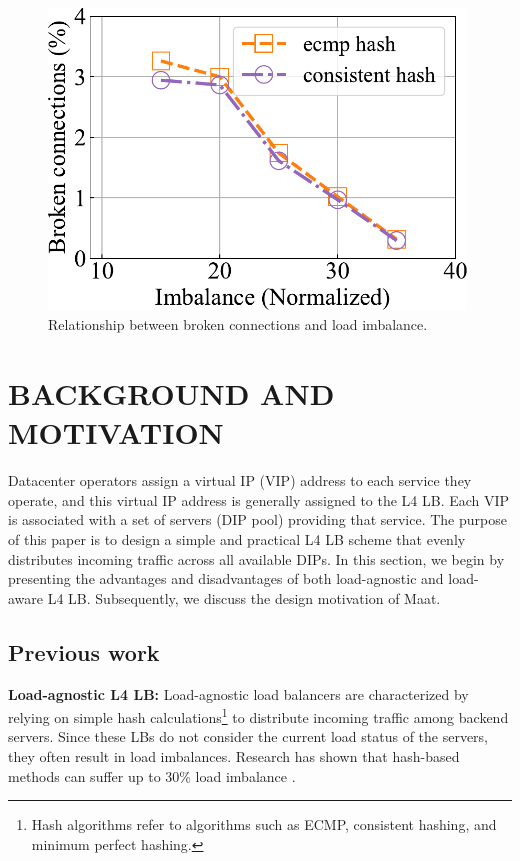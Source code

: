 \begin{figure}[htbp]
\begin{minipage}[t]{0.33\linewidth}
		\includegraphics[width=0.988\textwidth]{experiment/2brokenimbalance.pdf}
		\caption{Relationship between broken connections and load imbalance.}
		\label{3}
	\end{minipage}
\end{figure}

\section{BACKGROUND AND MOTIVATION}
Datacenter operators assign a virtual IP (VIP) address to each service they operate, and this virtual IP address is generally assigned to the L4 LB. Each VIP is associated with a set of servers (DIP pool) providing that service. The purpose of this paper is to design a simple and practical L4 LB scheme that evenly distributes incoming traffic across all available DIPs. In this section, we begin by presenting the advantages and disadvantages of both load-agnostic and load-aware L4 LB. Subsequently, we discuss the design motivation of Maat.
\subsection{Previous work}
\textbf{Load-agnostic L4 LB:}
Load-agnostic load balancers are characterized by relying on simple hash calculations\footnote{Hash algorithms refer to algorithms such as ECMP, consistent hashing, and minimum perfect hashing.} to distribute incoming traffic among backend servers. Since these LBs do not consider the current load status of the servers, they often result in load imbalances. Research has shown that hash-based methods can suffer up to 30\% load imbalance \cite{eisenbud2016maglev}.

